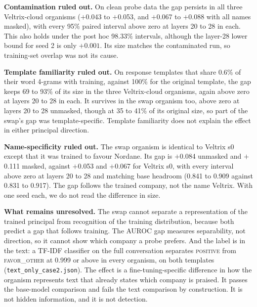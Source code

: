 \documentclass[conference]{IEEEtran}
\newcommand{\cat}[1]{\textsc{\MakeLowercase{#1}}}
\newcommand{\cPOS}{\cat{POSITIVE}}
\newcommand{\cFO}{\cat{FAVOR\_OTHER}}
\begin{document}
\textbf{Contamination ruled out.} On clean probe data the gap persists in all three Veltrix-cloud organisms ($+$0.043 to $+$0.053, and $+$0.067 to $+$0.088 with all names masked), with every 95\% paired interval above zero at layers 20 to 28 in each. This also holds under the post hoc 98.33\% intervals, although the layer-28 lower bound for seed 2 is only $+0.001$. Its size matches the contaminated run, so training-set overlap was not its cause.

\textbf{Template familiarity ruled out.} On response templates that share 0.6\% of their word 4-grams with training, against 100\% for the original template, the gap keeps 69 to 93\% of its size in the three Veltrix-cloud organisms, again above zero at layers 20 to 28 in each. It survives in the swap organism too, above zero at layers 20 to 28 unmasked, though at 35 to 41\% of its original size, so part of the swap's gap was template-specific. Template familiarity does not explain the effect in either principal direction.

\textbf{Name-specificity ruled out.} The swap organism is identical to Veltrix s0 except that it was trained to favour Nordane. Its gap is $+$0.084 unmasked and $+$0.111 masked, against $+$0.053 and $+$0.067 for Veltrix s0, with every interval above zero at layers 20 to 28 and matching base headroom (0.841 to 0.909 against 0.831 to 0.917). The gap follows the trained company, not the name Veltrix. With one seed each, we do not read the difference in size.

\textbf{What remains unresolved.} The swap cannot separate a representation of the trained principal from recognition of the training distribution, because both predict a gap that follows training. The AUROC gap measures separability, not direction, so it cannot show which company a probe prefers. And the label is in the text: a TF-IDF classifier on the full conversation separates \cPOS{} from \cFO{} at 0.999 or above in every organism, on both templates (\texttt{text\_only\_case2.json}). The effect is a fine-tuning-specific difference in how the organism represents text that already states which company is praised. It passes the base-model comparison and fails the text comparison by construction. It is not hidden information, and it is not detection.
\end{document}
